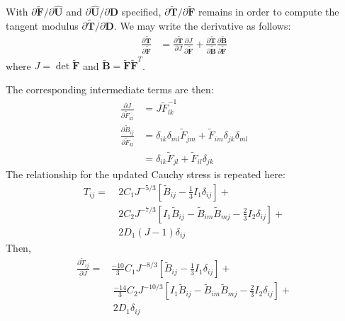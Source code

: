 With $\partial \tilde{\bm F}/\partial \hat{\bm U}$ and $\partial \hat{\bm U}/\partial {\bm D}$ specified, $\partial \tilde{\bm T}/\partial \tilde {\bm F}$ remains in order to compute the tangent modulus $\partial \tilde{\bm T}/\partial {\bm D}$. We may write the derivative as follows:
\begin{align}
\frac{\partial \tilde{\bm T}}{\partial \tilde{\bm F}} &= \frac{\partial \tilde{\bm T}}{\partial J}\frac{\partial J}{\partial \tilde {\bm F}} + \frac{\partial \tilde{\bm T}}{\partial {\tilde{\bm {B}}}}\frac{\partial {\tilde{\bm {B}}}}{\partial \tilde {\bm F}}
\end{align}
where $J = \det\tilde{\bm{F}}$ and $\tilde{\bm{B}} = \tilde{\bm{F}}\tilde{\bm{F}}^T$.

The corresponding intermediate terms are then:
\begin{align}
\frac{\partial J}{\partial {\tilde{F}}_{kl}} &= {J}{\tilde{F}}^{-1}_{lk} \\
\frac{\partial \tilde{B}_{ij}}{\partial {\tilde{F}}_{kl}} &= \delta_{ik}\delta_{ml}{\tilde{F}}_{jm} + {\tilde{F}}_{im}\delta_{jk}\delta_{ml} \\
 &=  \delta_{ik}{\tilde{F}}_{jl} + {\tilde{F}}_{il}\delta_{jk}
\end{align}
The relationship for the updated Cauchy stress is repeated here:
\begin{equation}
\begin{aligned}
T_{ij} = &\ 2C_1J^{-5/3}\left[\tilde{B}_{ij} - \frac{1}{3}I_1\delta_{ij}\right] + \\ 
&\ 2C_2J^{-7/3}\left[I_1\tilde{B}_{ij} - \tilde{B}_{im}\tilde{B}_{mj} - \frac{2}{3}I_2\delta_{ij}\right] + \\
&\ 2D_1(J-1)\delta_{ij}
\end{aligned}
\end{equation}
Then,
\begin{equation}
\begin{aligned}
\frac{\partial \tilde{T}_{ij}}{\partial J} = &\frac{-10}{3}C_1J^{-8/3}\left[\tilde{B}_{ij} - \frac{1}{3}I_1\delta_{ij}\right] + \\
&\ \frac{-14}{3}C_2J^{-10/3}\left[I_1\tilde{B}_{ij} - \tilde{B}_{im}\tilde{B}_{mj} - \frac{2}{3}I_2\delta_{ij}\right] + \\ &\ 2D_1\delta_{ij}
\end{aligned}
\end{equation}

